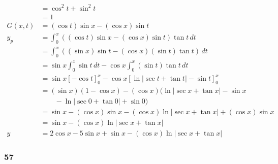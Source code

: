 \documentclass{article}
\begin{document}
\begin{align*}
                  & = \cos^2 t + \sin^2 t                                                         \\
                  & = 1                                                                           \\
  G(x, t)         & = (\cos t) \sin x - (\cos x) \sin t                                           \\
  y_p             & = \int_0^x ((\cos t) \sin x - (\cos x) \sin t) \tan t \,dt                    \\
                  & = \int_0^x ((\sin x) \sin t - (\cos x) (\sin t) \tan t) \,dt                  \\
                  & = \sin x \int_0^x \sin t \,dt - \cos x \int_0^x (\sin t) \tan t \,dt          \\
                  & = \sin x [-\cos t]_0^x - \cos x [\ln |\sec t + \tan t| - \sin t]_0^x          \\
                  & = (\sin x) (1 - \cos x) - (\cos x) (\ln |\sec x + \tan x| - \sin x            \\
                  & \qquad - \ln |\sec 0 + \tan 0| + \sin 0)                                      \\
                  & = \sin x - (\cos x) \sin x - (\cos x) \ln |\sec x + \tan x| + (\cos x) \sin x \\
                  & = \sin x - (\cos x) \ln |\sec x + \tan x|                                     \\
  y               & = 2 \cos x - 5 \sin x + \sin x - (\cos x) \ln |\sec x + \tan x|
\end{align*}

\subsubsection{57}
\end{document}
